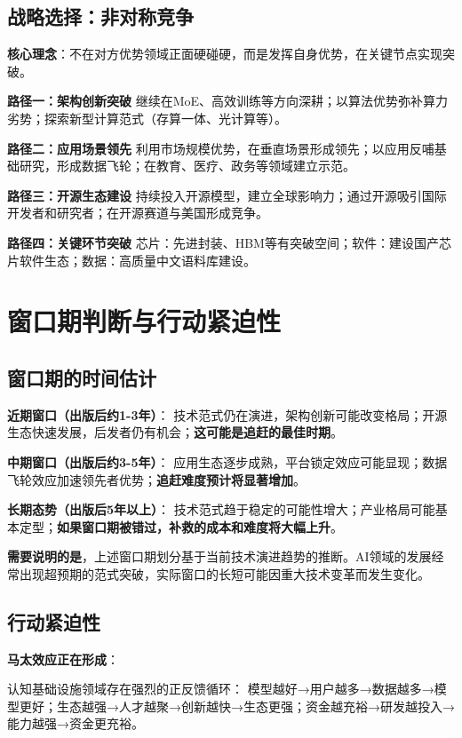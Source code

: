 \subsection{战略选择：非对称竞争}

\textbf{核心理念}：不在对方优势领域正面硬碰硬，而是发挥自身优势，在关键节点实现突破。

\textbf{路径一：架构创新突破}
继续在MoE、高效训练等方向深耕；以算法优势弥补算力劣势；探索新型计算范式（存算一体、光计算等）。

\textbf{路径二：应用场景领先}
利用市场规模优势，在垂直场景形成领先；以应用反哺基础研究，形成数据飞轮；在教育、医疗、政务等领域建立示范。

\textbf{路径三：开源生态建设}
持续投入开源模型，建立全球影响力；通过开源吸引国际开发者和研究者；在开源赛道与美国形成竞争。

\textbf{路径四：关键环节突破}
芯片：先进封装、HBM等有突破空间；软件：建设国产芯片软件生态；数据：高质量中文语料库建设。

\section{窗口期判断与行动紧迫性}

\subsection{窗口期的时间估计}

\textbf{近期窗口（出版后约1-3年）}：
技术范式仍在演进，架构创新可能改变格局；开源生态快速发展，后发者仍有机会；\textbf{这可能是追赶的最佳时期}。

\textbf{中期窗口（出版后约3-5年）}：
应用生态逐步成熟，平台锁定效应可能显现；数据飞轮效应加速领先者优势；\textbf{追赶难度预计将显著增加}。

\textbf{长期态势（出版后5年以上）}：
技术范式趋于稳定的可能性增大；产业格局可能基本定型；\textbf{如果窗口期被错过，补救的成本和难度将大幅上升}。

\textbf{需要说明的是}，上述窗口期划分基于当前技术演进趋势的推断。AI领域的发展经常出现超预期的范式突破，实际窗口的长短可能因重大技术变革而发生变化。

\subsection{行动紧迫性}

\textbf{马太效应正在形成}：

认知基础设施领域存在强烈的正反馈循环：
模型越好→用户越多→数据越多→模型更好；生态越强→人才越聚→创新越快→生态更强；资金越充裕→研发越投入→能力越强→资金更充裕。

